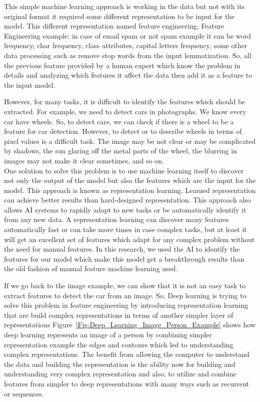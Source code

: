       This simple machine learning approach is working in the data but not with its original format it required some different representation to be input for the model. This different representation named feature engineering. Feature Engineering example: in case of email spam or not spam example it can be word frequency, char frequency, class attributes, capital letters frequency, some other data processing such as remove stop words from the input lemmatization. So, all the previous feature provided by a human expert which know the problem in details and analyzing which features it affect the data then add it as a feature to the input model.
      

      However, for many tasks, it is difficult to identify the features which should be extracted. For example, we need to detect cars in photographs. We know every car have wheels. So, to detect cars, we can check if there is a wheel to be a feature for car detection. However, to detect or to describe wheels in terms of pixel values is a difficult task. The image may be not clear or may be complicated by shadows, the sun glaring off the metal parts of the wheel, the blurring in images may not make it clear sometimes, and so on\cite{Goodfellow-et-al-2016}.\\

      One solution to solve this problem is to use machine learning itself to discover not only the output of the model but also the features which are the input for the model. This approach is known as representation learning. Learned representation can achieve better results than hard-designed representation. This approach also allows AI systems to rapidly adapt to new tasks or be automatically identify it from any new data. A representation learning can discover many features automatically fast or can take more times in case complex tasks, but at least it will get an excellent set of features which adapt for any complex problem without the need for manual features. In this research, we used the AI to identify the features for our model which make this model get a breakthrough results than the old fashion of manual feature machine learning used.

      If we go back to the image example, we can show that it is not an easy task to extract features to detect the car from an image. So, Deep learning is trying to solve this problem in feature engineering by introducing representation learning that are build complex representations in terms of another simpler layer of representations Figure~\ref{Fig:Deep_Learning_Image_Person_Example} shows how deep learning represents an image of a person by combining simpler representation example the edges and contours which led to understanding complex representations. The benefit from allowing the computer to understand the data and building the representation is the ability now for building and understanding very complex representation and also, to utilize and combine features from simpler to deep representations with many ways such as recurrent or sequences.

